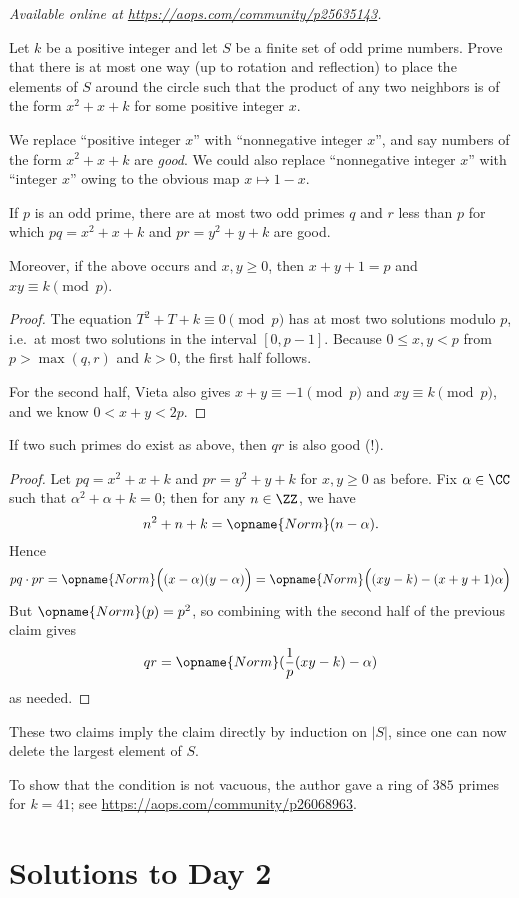 \textsl{Available online at \url{https://aops.com/community/p25635143}.}
\begin{mdframed}[style=mdpurplebox,frametitle={Problem statement}]
Let $k$ be a positive integer and let $S$ be a finite set of odd prime numbers.
Prove that there is at most one way (up to rotation and reflection)
to place the elements of $S$ around the circle such that the product
of any two neighbors is of the form $x^2+x+k$ for some positive integer $x$.
\end{mdframed}
We replace ``positive integer $x$'' with ``nonnegative integer $x$'',
and say numbers of the form $x^2+x+k$ are \emph{good}.
We could also replace ``nonnegative integer $x$'' with ``integer $x$''
owing to the obvious map $x \mapsto 1-x$.

\begin{claim*}
  If $p$ is an odd prime, there are at most two odd primes $q$ and $r$
  less than $p$ for which $pq = x^2+x+k$ and $pr = y^2+y+k$ are good.

  Moreover, if the above occurs and $x,y \ge 0$,
  then $x+y+1=p$ and $xy \equiv k \pmod p$.
\end{claim*}
\begin{proof}
  The equation $T^2+T+k \equiv 0 \pmod{p}$ has at most two solutions
  modulo $p$, i.e.\ at most two solutions in the interval $[0,p-1]$.
  Because $0 \le x,y < p$ from $p > \max(q,r)$ and $k > 0$,
  the first half follows.

  For the second half,
  Vieta also gives $x+y \equiv -1 \pmod p$ and $xy \equiv k \pmod p$,
  and we know $0 < x+y < 2p$.
\end{proof}

\begin{claim*}
  If two such primes do exist as above, then $qr$ is also good (!).
\end{claim*}
\begin{proof}
  Let $pq = x^2+x+k$ and $pr = y^2+y+k$ for $x,y \ge 0$ as before.
  Fix $\alpha \in \CC$ such that $\alpha^2 + \alpha + k = 0$;
  then for any $n \in \ZZ$, we have
  \[ n^2 + n + k = \opname{Norm}(n-\alpha). \]
  Hence
  \[
    pq \cdot pr = \opname{Norm}\Big((x-\alpha)(y-\alpha)\Big)
    = \opname{Norm}\Big( (xy-k) - (x+y+1)\alpha\Big)
  \]
  But $\opname{Norm}(p) = p^2$,
  so combining with the second half of the previous claim gives
  \[ qr = \opname{Norm}(\frac1p(xy-k)-\alpha) \] as needed.
\end{proof}

These two claims imply the claim directly by induction on $|S|$,
since one can now delete the largest element of $S$.

\begin{remark*}
  To show that the condition is not vacuous,
  the author gave a ring of $385$ primes for $k=41$;
  see \url{https://aops.com/community/p26068963}.
\end{remark*}
\pagebreak

\section{Solutions to Day 2}
